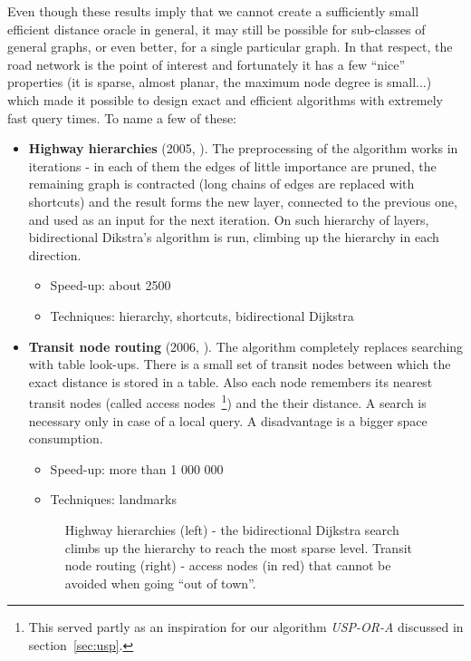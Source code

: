 	\noindent Even though these results imply that we cannot create a sufficiently small efficient distance oracle in general, it may still be possible for sub-classes of general graphs, or even better, for a single particular graph. In that respect, the road network is the point of interest and fortunately it has a few ``nice'' properties (it is sparse, almost planar, the maximum node degree is small...) which made it possible to design exact and efficient algorithms with extremely fast query times. To name a few of these:
	\begin{itemize}
		\item \textbf{Highway hierarchies} (2005, \cite{hwhierarchies05}). The preprocessing of the algorithm works in iterations - in each of them the edges of little importance are pruned, the remaining graph is contracted (long chains of edges are replaced with shortcuts) and the result forms the new layer, connected to the previous one, and used as an input for the next iteration. On such hierarchy of layers, bidirectional Dikstra's algorithm is run, climbing up the hierarchy in each direction.
		\begin{itemize}
			\item Speed-up: about 2500
			\item Techniques: hierarchy, shortcuts, bidirectional Dijkstra
		\end{itemize}
		\item \textbf{Transit node routing} (2006, \cite{transit06}). The algorithm completely replaces searching with table look-ups. There is a small set of transit nodes between which the exact distance is stored in a table. Also each node remembers its nearest transit nodes (called access nodes~\footnote{This served partly as an inspiration for our algorithm \textit{USP-OR-A} discussed in section~\ref{sec:usp}.}) and the their distance. A search is necessary only in case of a local query. A disadvantage is a bigger space consumption.
		\begin{itemize}
			\item Speed-up: more than 1 000 000
			\item Techniques: landmarks
		\end{itemize}

		\begin{figure}[h!]
		\centering
	    \caption{\label{fig:hwhier} Highway hierarchies (left) - the bidirectional Dijkstra search climbs up the hierarchy to reach the most sparse level. Transit node routing (right) - access nodes (in red) that cannot be avoided when going ``out of town''.}
		\end{figure}
		

\end{itemize}
